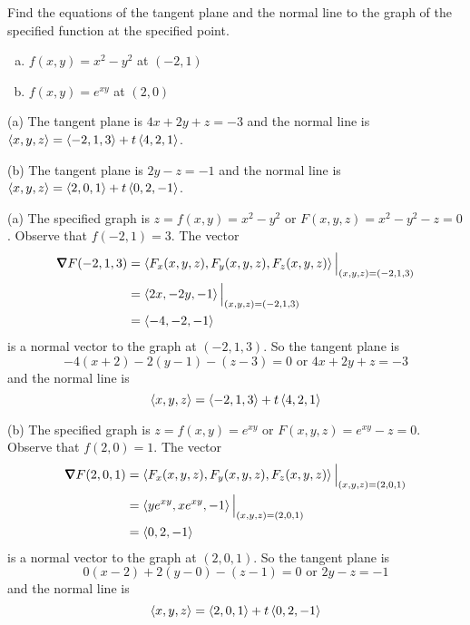 \begin{question}
Find the equations of the tangent plane and the normal line to the graph
of the specified function at the specified point.
\begin{enumerate}[(a)]
\item
$f(x,y)=x^2-y^2$ at $(-2,1)$

\item
$f(x,y)=e^{xy}$ at $(2,0)$
\end{enumerate}
\end{question}


\begin{answer}
(a)  The tangent plane is  $4x+2y+z=-3$
      and the normal line is  $\left< x,y,z\right>=\left< -2,1,3\right>+t\left< 4,2,1\right>$.

(b) The tangent plane is  $2y-z=-1$
      and the normal line is  $\left< x,y,z\right>=\left< 2,0,1\right>+t\left< 0,2,-1\right>$.


\end{answer}

\begin{solution}
(a)
The specified graph is $z=f(x,y)=x^2-y^2$ or $F(x,y,z)=x^2-y^2-z=0$. 
Observe that $f(-2,1)=3$. The vector 
\begin{align*}
\vnabla F(-2,1,3) 
&= \llt F_x(x,y,z),F_y(x,y,z),F_z(x,y,z)\rgt\Big|_{(x,y,z)=(-2,1,3)} \\
&= \llt 2x,-2y,-1\rgt\Big|_{(x,y,z)=(-2,1,3)} \\
&= \llt -4,-2,-1\rgt
\end{align*} 
is a normal vector to the graph at $(-2,1,3)$. 
So the tangent plane is
\begin{equation*}
-4(x+2)-2(y-1)-(z-3)=0\text{ or } 4x+2y+z=-3
\end{equation*}
and the normal line is 
\begin{equation*}
\left< x,y,z\right>=\left< -2,1,3\right>+t\left< 4,2,1\right>
\end{equation*}

(b)
The specified graph is $z=f(x,y)=e^{xy}$ or $F(x,y,z)=e^{xy}-z=0$. 
Observe that $f(2,0)=1$. The vector 
\begin{align*}
\vnabla F(2,0,1) 
&= \llt F_x(x,y,z),F_y(x,y,z),F_z(x,y,z)\rgt\Big|_{(x,y,z)=(2,0,1)} \\
&= \llt ye^{xy},xe^{xy},-1\rgt\Big|_{(x,y,z)=(2,0,1)} \\
&= \llt 0,2,-1\rgt
\end{align*} 
is a normal vector to the graph at $(2,0,1)$. 
So the tangent plane is
\begin{equation*}
0(x-2)+2(y-0)-(z-1)=0\text{ or } 2y-z=-1
\end{equation*}
and the normal line is 
\begin{equation*}
\left< x,y,z\right>=\left< 2,0,1\right>+t\left< 0,2,-1\right>
\end{equation*}
\end{solution}

